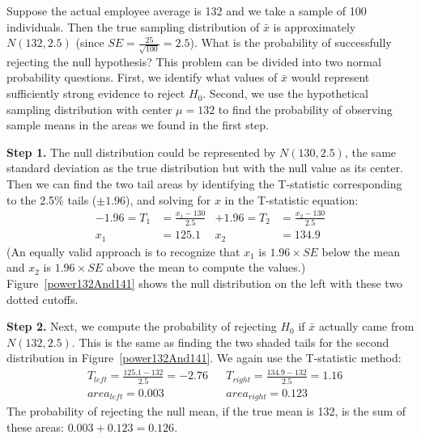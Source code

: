 \begin{example}{Suppose the actual employee average is 132 and we take a sample of 100 individuals. Then the true sampling distribution of $\bar{x}$ is approximately $N(132, 2.5)$ (since $SE = \frac{25}{\sqrt{100}} = 2.5$). What is the probability of successfully rejecting the null hypothesis?}
\label{computePowerIfMuIs132AndMu0Is130}
This problem can be divided into two normal probability questions. First, we identify what values of $\bar{x}$ would represent sufficiently strong evidence to reject $H_0$. Second, we use the hypothetical sampling distribution with center $\mu=132$ to find the probability of observing sample means in the areas we found in the first step.

\textbf{Step 1.} The null distribution could be represented by $N(130, 2.5)$, the same standard deviation as the true distribution but with the null value as its center. Then we can find the two tail areas by identifying the T-statistic corresponding to the 2.5\% tails ($\pm 1.96$), and solving for $x$ in the T-statistic equation:
\begin{align*}
-1.96 = T_1 &= \frac{x_1 - 130}{2.5}
	&+1.96 = T_2 &= \frac{x_2 - 130}{2.5} \\
x_1 &= 125.1
	&x_2 &= 134.9
\end{align*}
(An equally valid approach is to recognize that $x_1$ is $1.96\times SE$ below the mean and $x_2$ is $1.96\times SE$ above the mean to compute the values.) Figure~\ref{power132And141} shows the null distribution on the left with these two dotted cutoffs.

\textbf{Step 2.} Next, we compute the probability of rejecting $H_0$ if $\bar{x}$ actually came from $N(132, 2.5)$. This is the same as finding the two shaded tails for the second distribution in Figure~\ref{power132And141}. We again use the T-statistic method:
\begin{align*}
&T_{left} = \frac{125.1 - 132}{2.5} = -2.76
	&&T_{right} = \frac{134.9 - 132}{2.5} = 1.16 \\
&area_{left} =0.003
	&&area_{right} =0.123
\end{align*}
The probability of rejecting the null mean, if the true mean is 132, is the sum of these areas: $0.003 + 0.123 = 0.126$.
\end{example}

